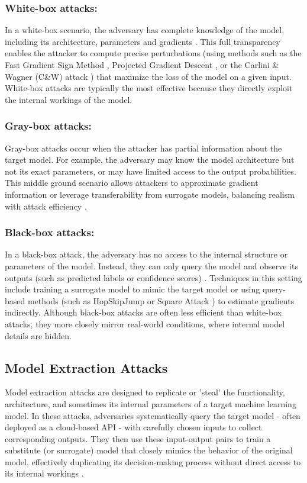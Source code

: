 \documentclass[conference]{IEEEtran}
\begin{document}
\subsubsection{White-box attacks:}
In a white-box scenario, the adversary has complete knowledge of the model, including its architecture, parameters and gradients \cite{ren2020adversarial}. This full transparency enables the attacker to compute precise perturbations (using methods such as the Fast Gradient Sign Method \cite{naqvi2023adversarial}, Projected Gradient Descent \cite{deng2020universal}, or the Carlini \& Wagner (C\&W) attack \cite{pujari2022approach}) that maximize the loss of the model on a given input. White-box attacks are typically the most effective because they directly exploit the internal workings of the model.

\subsubsection{Gray-box attacks:}
Gray-box attacks occur when the attacker has partial information about the target model. For example, the adversary may know the model architecture but not its exact parameters, or may have limited access to the output probabilities. This middle ground scenario allows attackers to approximate gradient information or leverage transferability from surrogate models, balancing realism with attack efficiency \cite{ren2020adversarial}.

\subsubsection{Black-box attacks:}
In a black-box attack, the adversary has no access to the internal structure or parameters of the model. Instead, they can only query the model and observe its outputs (such as predicted labels or confidence scores) \cite{ren2020adversarial}. Techniques in this setting include training a surrogate model to mimic the target model or using query-based methods (such as HopSkipJump \cite{newaz2020adversarial} or Square Attack \cite{andriushchenko2020square}) to estimate gradients indirectly. Although black-box attacks are often less efficient than white-box attacks, they more closely mirror real-world conditions, where internal model details are hidden.


\subsection{Model Extraction Attacks}
Model extraction attacks are designed to replicate or 'steal' the functionality, architecture, and sometimes its internal parameters of a target machine learning model. In these attacks, adversaries systematically query the target model - often deployed as a cloud-based API - with carefully chosen inputs to collect corresponding outputs. They then use these input-output pairs to train a substitute (or surrogate) model that closely mimics the behavior of the original model, effectively duplicating its decision-making process without direct access to its internal workings \cite{golla2023security}.
\end{document}
